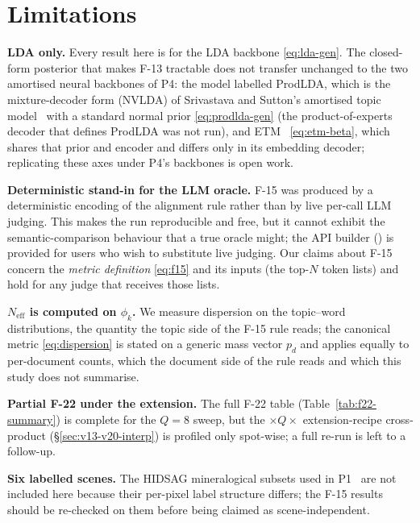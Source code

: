 \documentclass[journal,a4paper,10pt]{IEEEtran}
\begin{document}
\section{Limitations}\label{sec:limitations}

\textbf{LDA only.} Every result here is for the LDA backbone
\eqref{eq:lda-gen}. The closed-form posterior that makes F-13
tractable does not transfer unchanged to the two amortised neural
backbones of P4: the model labelled ProdLDA, which is the
mixture-decoder form (NVLDA) of Srivastava and Sutton's amortised topic
model~\cite{srivastava2017autoencoding} with a standard normal prior
\eqref{eq:prodlda-gen} (the product-of-experts decoder that defines
ProdLDA was not run), and ETM~\cite{dieng2020topic} \eqref{eq:etm-beta},
which shares that prior and encoder and differs only in its embedding
decoder; replicating these axes under P4's backbones is open work.

\textbf{Deterministic stand-in for the LLM oracle.} F-15 was produced by a
deterministic encoding of the alignment rule rather than by live
per-call LLM judging. This makes the run
reproducible and free, but it cannot exhibit the semantic-comparison
behaviour that a true oracle might; the API builder
() is provided for users
who wish to substitute live judging. Our claims about F-15 concern the
\emph{metric definition} \eqref{eq:f15} and its inputs (the top-$N$
token lists) and hold for any judge that receives those lists.

\textbf{$N_{\mathrm{eff}}$ is computed on $\phi_k$.} We measure
dispersion on the topic--word distributions, the quantity the
topic side of the F-15 rule reads; the canonical metric
\eqref{eq:dispersion} is stated on a generic mass vector $p_d$ and
applies equally to per-document counts, which the document side of the
rule reads and which this study does not summarise.

\textbf{Partial F-22 under the extension.} The full F-22 table
(Table~\ref{tab:f22-summary}) is complete for the $Q=8$ sweep, but the
$\times Q \times$ extension-recipe cross-product (\S\ref{sec:v13-v20-interp})
is profiled only spot-wise; a full re-run is left to a follow-up.

\textbf{Six labelled scenes.} The HIDSAG mineralogical subsets used in
P1~\cite{santibanezleal2026framework} are not included here because
their per-pixel label structure differs; the F-15 results should be
re-checked on them before being claimed as scene-independent.
\end{document}
